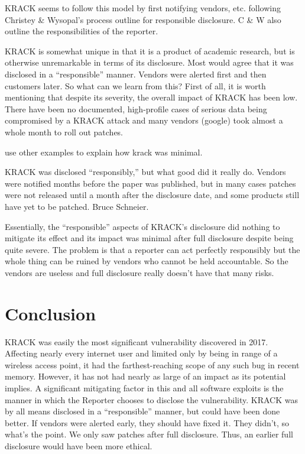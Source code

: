 \documentclass[12pt]{article}
\begin{document}
\begin{doublespace}
KRACK seems to follow this model by first notifying vendors, etc. following
Christey \& Wysopal's process outline for responsible disclosure. C \& W also
outline the responsibilities of the reporter.

KRACK is somewhat unique in that it is a product of academic research, but is
otherwise unremarkable in terms of its disclosure. Most would agree that it
was disclosed in a ``responsible'' manner. Vendors were alerted first and then
customers later. So what can we learn from this? First of all, it is worth
mentioning that despite its severity, the overall impact of KRACK has been low.
There have been no documented, high-profile cases of serious data being
compromised by a KRACK attack and many vendors (google) took almost a whole
month to roll out patches.

use other examples to explain how krack was minimal.

KRACK was disclosed ``responsibly,'' but what good did it really do. Vendors
were notified months before the paper was published, but in many cases patches
were not released until a month after the disclosure date, and some products
still have yet to be patched. Bruce Schneier.

Essentially, the ``responsible'' aspects of KRACK's disclosure did nothing to
mitigate its effect and its impact was minimal after full disclosure despite
being quite severe. The problem is that a reporter can act perfectly
responsibly but the whole thing can be ruined by vendors who cannot be held
accountable. So the vendors are useless and full disclosure really doesn't 
have that many risks.

\section*{Conclusion}
KRACK was easily the most significant vulnerability discovered in 2017.
Affecting nearly every internet user and limited only by being in range of a
wireless access point, it had the farthest-reaching scope of any such bug in
recent memory. However, it has not had nearly as large of an impact as its
potential implies. A significant mitigating factor in this and all software
exploits is the manner in which the Reporter chooses to disclose the
vulnerability. KRACK was by all means disclosed in a ``responsible'' manner,
but could have been done better. If vendors were alerted early, they should
have fixed it. They didn't, so what's the point. We only saw patches after full
disclosure. Thus, an earlier full disclosure would have been more ethical.


\end{doublespace}
\end{document}
